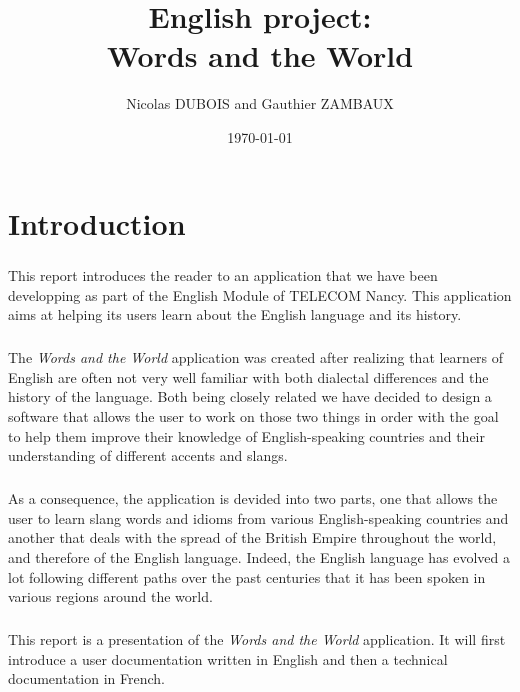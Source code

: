 \documentclass[11pt, a4paper]{report}
\title{English project:\\Words and the World}
\author{Nicolas DUBOIS and Gauthier ZAMBAUX}
\date{\today}
\begin{document}
\maketitle


\chapter*{Introduction}
\paragraph{}This report introduces the reader to an application that we have been developping as part of the English Module of TELECOM Nancy. This application aims at helping its users learn about the English language and its history.

\paragraph{}The \textit{Words and the World} application was created after realizing that learners of English are often not very well familiar with both dialectal differences and the history of the language. Both being closely related we have decided to design a software that allows the user to work on those two things in order with the goal to help them improve their knowledge of English-speaking countries and their understanding of different accents and slangs.

\paragraph{}As a consequence, the application is devided into two parts, one that allows the user to learn slang words and idioms from various English-speaking countries and another that deals with the spread of the British Empire throughout the world, and therefore of the English language. Indeed, the English language has evolved a lot following different paths over the past centuries that it has been spoken in various regions around the world.

\paragraph{}This report is a presentation of the \textit{Words and the World} application. It will first introduce a user documentation written in English and then a technical documentation in French.
\end{document}
